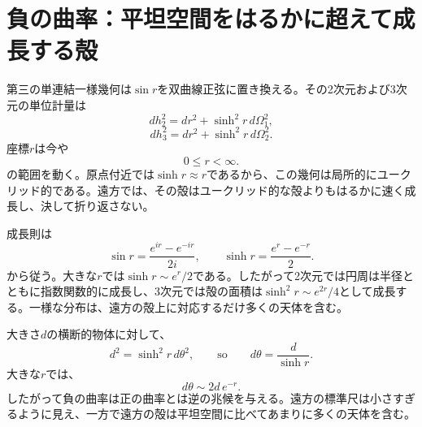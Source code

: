 \section{負の曲率：平坦空間をはるかに超えて成長する殻}

第三の単連結一様幾何は\(\sin r\)を双曲線正弦に置き換える。その2次元および3次元の単位計量は
\begin{equation}
dh_2^2 = dr^2 + \sinh^2 r\, d\Omega_1^2,
\label{eq:c03-hyperbolic-two}
\end{equation}
\begin{equation}
dh_3^2 = dr^2 + \sinh^2 r\, d\Omega_2^2.
\label{eq:c03-hyperbolic-three}
\end{equation}
座標\(r\)は今や
\begin{equation}
0\le r<\infty.
\end{equation}
の範囲を動く。原点付近では\(\sinh r\approx r\)であるから、この幾何は局所的にユークリッド的である。遠方では、その殻はユークリッド的な殻よりもはるかに速く成長し、決して折り返さない。

成長則は
\begin{equation}
\sin r = \frac{e^{ir}-e^{-ir}}{2i},
\qquad
\sinh r = \frac{e^r-e^{-r}}{2}.
\label{eq:c03-sin-sinh}
\end{equation}
から従う。大きな\(r\)では\(\sinh r\sim e^r/2\)である。したがって2次元では円周は半径とともに指数関数的に成長し、3次元では殻の面積は\(\sinh^2r\sim e^{2r}/4\)として成長する。一様な分布は、遠方の殻上に対応するだけ多くの天体を含む。

大きさ\(d\)の横断的物体に対して、
\begin{equation}
d^2 = \sinh^2 r\, d\theta^2,
\qquad\text{so}\qquad
d\theta = \frac{d}{\sinh r}.
\label{eq:c03-hyperbolic-angle}
\end{equation}
大きな\(r\)では、
\begin{equation}
d\theta \sim 2d\,e^{-r}.
\end{equation}
したがって負の曲率は正の曲率とは逆の兆候を与える。遠方の標準尺は小さすぎるように見え、一方で遠方の殻は平坦空間に比べてあまりに多くの天体を含む。

\begin{classroomqa}
\end{classroomqa}

